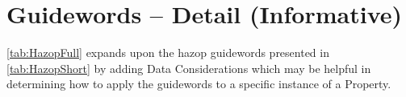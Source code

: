 %
%
\section{ Guidewords -- Detail (Informative)} \label{bkm:guidewords}


\autoref{tab:HazopFull}
expands upon the \gls{hazop} guidewords presented in \autoref{tab:HazopShort} by adding Data Considerations which may be helpful in determining how to apply the guidewords to a specific instance of a Property.

